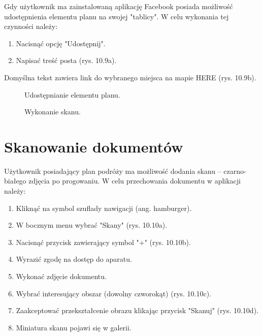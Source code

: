 \par Gdy użytkownik ma zainstalowaną aplikację Facebook posiada możliwość udostępnienia elementu planu na swojej "tablicy". W celu wykonania tej czynności należy:
\begin{enumerate}
\item Nacisnąć opcję "Udostępnij".
\item Napisać treść posta (rys. 10.9a).
\end{enumerate}
Domyślna tekst zawiera link do wybranego miejsca na mapie HERE (rys. 10.9b).

\begin{figure}[h]

\centering
\null\hfill
{}
\hfill
{}
\hfill\null

\caption{Udostępnianie elementu planu.}
\label{fig:podrecznik8}
\end{figure}
\FloatBarrier

\begin{figure}[h]

\centering
\null\hfill
{}
\hfill
{}
\hfill\null

\null\hfill
{}
\hfill
{}
\hfill\null

\caption{Wykonanie skanu.}
\label{fig:podrecznik8}
\end{figure}
\FloatBarrier

\section{Skanowanie dokumentów}
Użytkownik posiadający plan podróży ma możliwość dodania skanu – czarno-białego zdjęcia po progowaniu.
W celu przechowania dokumentu w aplikacji należy:
\begin{enumerate}
\item Kliknąć na symbol szuflady nawigacji (ang. hamburger).
\item W bocznym menu wybrać "Skany" (rys. 10.10a).
\item Nacisnąć przycisk zawierający symbol "+" (rys. 10.10b).
\item Wyrazić zgodę na dostęp do aparatu.
\item Wykonać zdjęcie dokumentu.
\item Wybrać interesujący obszar (dowolny czworokąt) (rys. 10.10c).
\item Zaakceptować przekształcenie obrazu klikając przycisk "Skanuj" (rys. 10.10d).
\item Miniatura skanu pojawi się w galerii.
\end{enumerate}


